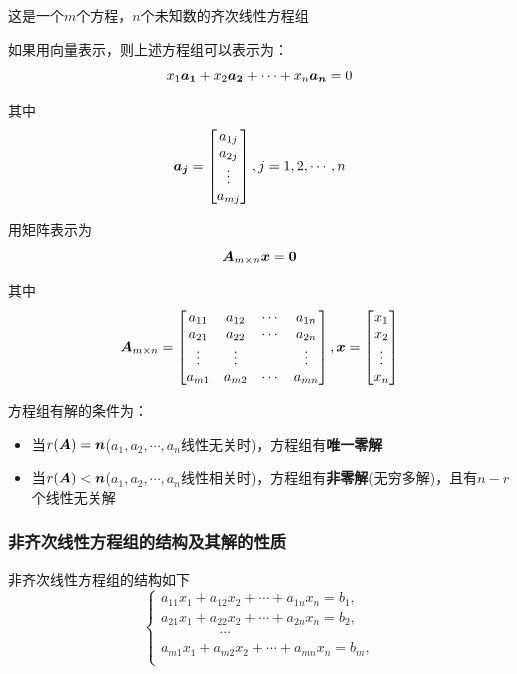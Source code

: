 \documentclass[12pt, a4paper, oneside, UTF8]{ctexbook}
\begin{document}
这是一个$m$个方程，$n$个未知数的齐次线性方程组

如果用向量表示，则上述方程组可以表示为：\[x_1\boldsymbol{a_1}+x_2\boldsymbol{a_2}+\cdots+x_n\boldsymbol{a_n}=0\]

其中\[\boldsymbol{a_j}=
\begin{bmatrix}
    a_{1j}\\
    a_{2j}\\
    \vdots\\
    a_{mj}
\end{bmatrix},j=1,2,\cdots, n
\]

用矩阵表示为\[\boldsymbol{A}_{m\times n}\boldsymbol{x}=\boldsymbol{0}\]

其中\[
    \boldsymbol{A}_{m\times n}=\begin{bmatrix}
        a_{11}&a_{12}&\cdots&a_{1n}\\
        a_{21}&a_{22}&\cdots&a_{2n}\\
        \vdots&\vdots&&\vdots\\
        a_{m1}&a_{m2}&\cdots&a_{mn}
    \end{bmatrix},\boldsymbol{x}=\begin{bmatrix}
        x_1\\
        x_2\\
        \vdots\\
        x_n
    \end{bmatrix}
\]

方程组有解的条件为：
\begin{itemize}
    \item 当$r(\boldsymbol{A})=\boldsymbol{n}$($a_1, a_2, \cdots, a_n$线性无关时)，方程组有\textbf{唯一零解}
    \item 当$r(\boldsymbol{A})<\boldsymbol{n}$($a_1, a_2, \cdots, a_n$线性相关时)，方程组有\textbf{非零解}(无穷多解)，且有$n-r$个线性无关解
\end{itemize}

\subsubsection{非齐次线性方程组的结构及其解的性质}
非齐次线性方程组的结构如下
\[
   \begin{cases}
    a_{11}x_1+a_{12}x_2+\cdots+a_{1n}x_n=b_1,\\
    a_{21}x_1+a_{22}x_2+\cdots+a_{2n}x_n=b_2,\\
      \ \ \ \ \ \ \ \ \ \ \ \ \ \ \ \ \ \ \ \cdots\\
    a_{m1}x_1+a_{m2}x_2+\cdots+a_{mn}x_n=b_m,\\
   \end{cases} 
\]
\end{document}
